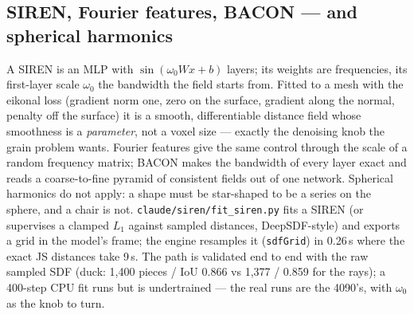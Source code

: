 \documentclass[10pt,a4paper]{article}
\newcommand{\code}[1]{\texttt{\small #1}}
\begin{document}
\subsection{SIREN, Fourier features, BACON --- and spherical harmonics}
A SIREN is an MLP with $\sin(\omega_0 W x+b)$ layers; its weights are frequencies, its first-layer scale $\omega_0$ the bandwidth
the field starts from. Fitted to a mesh with the eikonal loss (gradient norm one, zero on the surface, gradient along the normal,
penalty off the surface) it is a smooth, differentiable distance field whose smoothness is a \emph{parameter}, not a voxel size ---
exactly the denoising knob the grain problem wants. Fourier features give the same control through the scale of a random
frequency matrix; BACON makes the bandwidth of every layer exact and reads a coarse-to-fine pyramid of consistent fields out of
one network. Spherical harmonics do not apply: a shape must be star-shaped to be a series on the sphere, and a chair is not.
\code{claude/siren/fit\_siren.py} fits a SIREN (or supervises a clamped $L_1$ against sampled distances, DeepSDF-style) and exports
a grid in the model's frame; the engine resamples it (\code{sdfGrid}) in 0.26\,s where the exact JS distances take 9\,s. The path is
validated end to end with the raw sampled SDF (duck: 1,400 pieces / IoU 0.866 vs 1,377 / 0.859 for the rays); a 400-step CPU fit
runs but is undertrained --- the real runs are the 4090's, with $\omega_0$ as the knob to turn.




\end{document}
